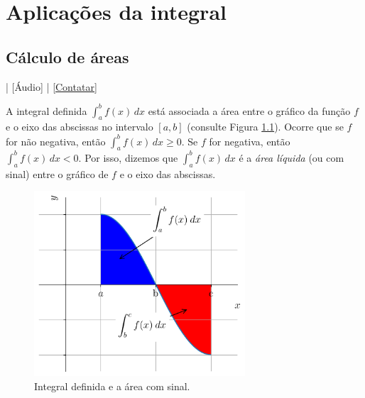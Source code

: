 
\chapter{Aplicações da integral}\label{cap_apint}
\thispagestyle{fancy}

\section{Cálculo de áreas}\label{cap_apint_sec_areas}

\begin{flushright}
  [Vídeo] | [Áudio] | \href{https://phkonzen.github.io/notas/contato.html}{[Contatar]}
\end{flushright}

A integral definida $\int_a^b f(x)\,dx$ está associada a área entre o gráfico da função $f$ e o eixo das abscissas no intervalo $[a,b]$ (consulte Figura \ref{fig:apint_arealiq}). Ocorre que se $f$ for não negativa, então $\int_a^b f(x)\,dx \geq 0$. Se $f$ for negativa, então $\int_a^b f(x)\,dx < 0$. Por isso, dizemos que $\int_a^b f(x)\,dx$ é a \emph{área líquida} (ou com sinal) entre o gráfico de $f$ e o eixo das abscissas.

\begin{figure}[H]
  \centering
  \includegraphics[width=0.7\textwidth]{./cap_apint/dados/fig_apint_arealiq/fig}
  \caption{Integral definida e a área com sinal.}
  \label{fig:apint_arealiq}
\end{figure}

